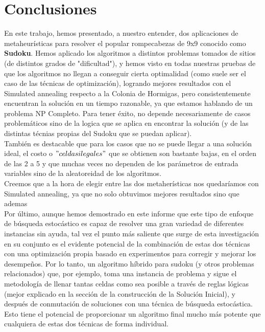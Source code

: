 \section{Conclusiones}

En este trabajo, hemos presentado, a nuestro entender, dos aplicaciones de metaheurísticas para resolver el popular rompecabezas de 9x9 conocido como \textbf{Sudoku}. Hemos aplicado los algoritmos a distintos problemas tomados de sitios (de distintos grados de "dificultad"), y hemos visto en todas nuestras pruebas de que los algoritmos no llegan a conseguir cierta optimalidad (como suele ser el caso de las técnicas de optimización), logrando mejores resultados con el Simulated annealing respecto a la Colonia de Hormigas, pero consistentemente encuentran la solución en un tiempo razonable, ya que estamos hablando de un problema NP Completo. Para tener éxito, no depende necesariamente de casos problemáticos sino de la logica que se aplica en encontrar la solución (y de las distintas técnias propias del Sudoku que se puedan aplicar).\\
También es destacable que para los casos que no se puede llegar a una solución ideal, el costo o $"celdas ilegales"$ que se obtienen son bastante bajas, en el orden de las 2 a 5 y que muchas veces no dependen de los parámetros de entrada variables sino de la aleatoreidad de los algoritmos. \\
Creemos que a la hora de elegir entre las dos metaherísticas nos quedaríamos con Simulated annealing, ya que no solo obtuvimos mejores resultados sino que ademas \\
Por último, aunque hemos demostrado en este informe que este tipo de enfoque de búsqueda estocástico es capaz de resolver una gran variedad de diferentes instancias sin ayuda, tal vez el punto más saliente que surge de esta investigación en su conjunto es el evidente potencial de la combinación de estas dos técnicas con una optimización propia basado en experimentos para corregir y mejorar los desempeños.  Por lo tanto, un algoritmo híbrido para sudoku (y otros problemas relacionados) que, por ejemplo, toma una instancia de problema y sigue el metodología de  llenar tantas celdas como sea posible a través de reglas lógicas (mejor explicado en la sección de la construcción de la Solución Inicial), y después de conmutación de soluciones con una técnica de búsqueda estocástica. Esto tiene el potencial de proporcionar un algoritmo final mucho más potente que cualquiera de estas dos técnicas de forma individual. 

